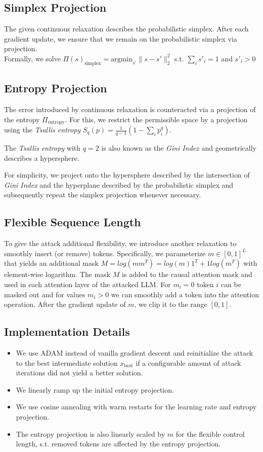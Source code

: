 \documentclass[a4paper, 11pt]{article}
\newcommand{\nt}[2]{\begin{note}{#1}{}#2\end{note}}
\begin{document}
\subsection{Simplex Projection}
The given continuous relaxation describes the probabilistic simplex. After each gradient update, we ensure that we remain on the probabilistic simplex via projection. \\
Formally, we solve $\Pi(s)_{\textrm{simplex}} = \textrm{argmin}_{s'} \lVert s - s' \rVert^2_2$ s.t. $\sum_i s'_i = 1$ and $s'_i > 0$

\subsection{Entropy Projection}
The error introduced by continuous relaxation is counteracted via a projection of the entropy $\Pi_\textrm{entropy}$. For this, we restrict the permissible space by a projection using the \emph{Tsallis entropy} $S_q(p) = \frac{1}{q-1}(1 - \sum_i p_i^q)$.
\nt{The \emph{Tsallis entropy} with $q=2$ is also known as the \emph{Gini Index} and geometrically describes a hypersphere.}{}
For simplicity, we project onto the hypersphere described by the intersection of \emph{Gini Index} and the hyperplane described by the probabilistic simplex and subsequently repeat the simplex projection whenever necessary.

\subsection{Flexible Sequence Length}
To give the attack additional flexibility, we introduce another relaxation to smoothly insert (or remove) tokens. Specifically, we parameterize $m \in \left[ 0,1 \right]^L$ that yields an additional mask $M = log(mm^T) = log(m)1^T + 1log(m^T)$ with element-wise logarithm. The mask $M$ is added to the causal attention mask and used in each attention layer of the attacked LLM. For $m_i = 0$ token $i$ can be masked out and for values $m_i > 0$ we can smoothly add a token into the attention operation. After the gradient update of $m$, we clip it to the range $\left [0, 1 \right]$.

\subsection{Implementation Details}
\begin{itemize}
  \item We use ADAM instead of vanilla gradient descent and reinitialize the attack to the best intermediate solution $x_\textrm{best}$ if a configurable amount of attack iterations did not yield a better solution.
  \item We linearly ramp up the initial entropy projection.
  \item We use cosine annealing with warm restarts for the learning rate and entropy projection.
  \item The entropy projection is also linearly scaled by $m$ for the flexible control length, s.t. removed tokens are affected by the entropy projection.
\end{itemize}
\end{document}
